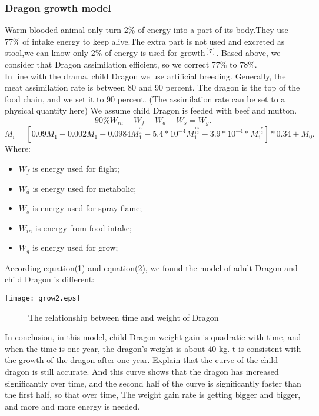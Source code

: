 \documentclass[12pt]{article}
\begin{document}
\subsubsection{Dragon growth model}%
Warm-blooded animal only turn 2\% of energy into a part of its body.They use 77\% of intake energy to keep alive.The extra part is not used and excreted as stool,we can know only 2\% of energy is used for growth$^[7]$.
Based above, we consider that Dragon assimilation efficient, so we correct 77\% to 78\%.\\
In line with the drama, child Dragon we use artificial breeding. Generally, the meat assimilation rate is between 80 and 90 percent. The dragon is the top of the food chain, and we set it to 90 percent. (The assimilation rate can be set to a physical quantity here)
We assume child Dragon is feeded with beef and mutton.
\begin{equation}
	90\%W_{in}-W_f-W_d-W_s=W_{g} .	%
\end{equation}
\begin{equation}
	M_i=\left[0.09M_1-0.002M_1-0.0984M_1^{\frac{3}{4}}-5.4*10^{-4}M_1^{\frac{13}{12}}-3.9*10^{-4}*M_1^{\frac{17}{12}}\right]*0.34+M_0 .	%
\end{equation}
Where:
\begin{itemize}
	 \item $W_f$ is energy used for flight;
	 \item $W_d$ is energy used for metabolic;
	 \item $W_s$ is energy used for spray flame;
	 \item $W_{in}$ is energy from food intake;	 
	 \item $W_g$ is energy used for grow;
\end{itemize}

According equation(1) and equation(2), we found the model of adult Dragon and child Dragon is different:

\centerline{\texttt{[image: grow2.eps]}}%
\begin{figure}[!htbp]
    \small
    \caption{The relationship between time and weight of Dragon}\label{jj}
\end{figure}

In conclusion, in this model, child Dragon weight gain is quadratic with time, and when the time is one year, the dragon’s weight is about 40 kg.
t is consistent with the growth of the dragon after one year. Explain that the curve of the child dragon is still accurate. And this curve shows that the dragon has increased significantly over time, and the second half of the curve is significantly faster than the first half, so that over time,
The weight gain rate is getting bigger and bigger, and more and more energy is needed.
\end{document}
